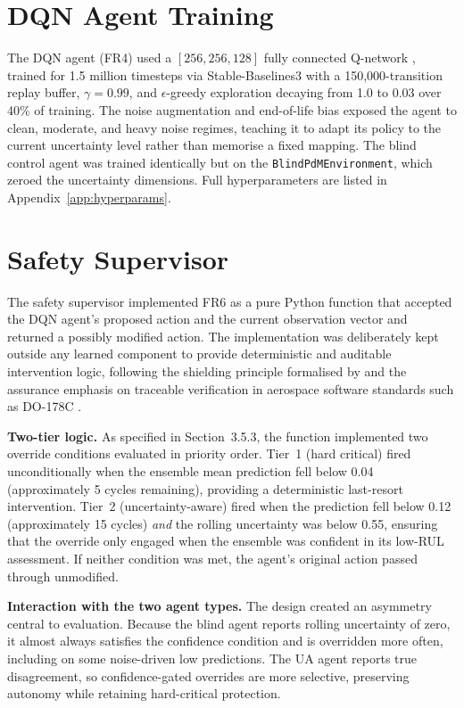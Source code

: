 \documentclass[12pt,a4paper]{report}
\begin{document}
\section{DQN Agent Training}

The DQN agent (FR4) used a $[256, 256, 128]$ fully connected Q-network \citep{mnih2015human}, trained for 1.5 million timesteps via Stable-Baselines3 \citep{raffin2021stable} with a 150,000-transition replay buffer, $\gamma = 0.99$, and $\epsilon$-greedy exploration decaying from 1.0 to 0.03 over 40\% of training. The noise augmentation and end-of-life bias exposed the agent to clean, moderate, and heavy noise regimes, teaching it to adapt its policy to the current uncertainty level rather than memorise a fixed mapping. The blind control agent was trained identically but on the \texttt{BlindPdMEnvironment}, which zeroed the uncertainty dimensions. Full hyperparameters are listed in Appendix~\ref{app:hyperparams}.

\section{Safety Supervisor}

The safety supervisor implemented FR6 as a pure Python function that accepted the DQN agent's proposed action and the current observation vector and returned a possibly modified action. The implementation was deliberately kept outside any learned component to provide deterministic and auditable intervention logic, following the shielding principle formalised by \citet{alshiekh2018safe} and the assurance emphasis on traceable verification in aerospace software standards such as DO-178C \citep{do178c}.


\textbf{Two-tier logic.} As specified in Section~3.5.3, the function implemented two override conditions evaluated in priority order. Tier~1 (hard critical) fired unconditionally when the ensemble mean prediction fell below 0.04 (approximately 5 cycles remaining), providing a deterministic last-resort intervention. Tier~2 (uncertainty-aware) fired when the prediction fell below 0.12 (approximately 15 cycles) \emph{and} the rolling uncertainty was below 0.55, ensuring that the override only engaged when the ensemble was confident in its low-RUL assessment. If neither condition was met, the agent's original action passed through unmodified.


\textbf{Interaction with the two agent types.} The design created an asymmetry central to evaluation. Because the blind agent reports rolling uncertainty of zero, it almost always satisfies the confidence condition and is overridden more often, including on some noise-driven low predictions. The UA agent reports true disagreement, so confidence-gated overrides are more selective, preserving autonomy while retaining hard-critical protection.
\end{document}
